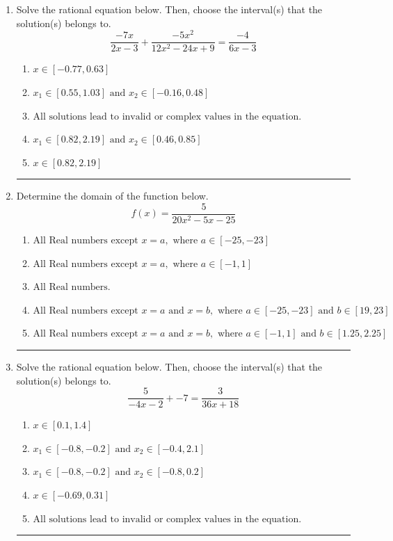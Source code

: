 \documentclass[14pt]{extbook}
\newcommand{\litem}[1]{\item#1\hspace*{-1cm}\rule{\textwidth}{0.4pt}}
\begin{document}
\begin{enumerate}
{\begin{enumerate}[label=\Alph*.]
\end{enumerate} }
\litem{
Solve the rational equation below. Then, choose the interval(s) that the solution(s) belongs to.\[ \frac{-7x}{2x -3} + \frac{-5x^{2}}{12x^{2} -24 x + 9} = \frac{-4}{6x -3} \]\begin{enumerate}[label=\Alph*.]
\item \( x \in [-0.77,0.63] \)
\item \( x_1 \in [0.55, 1.03] \text{ and } x_2 \in [-0.16,0.48] \)
\item \( \text{All solutions lead to invalid or complex values in the equation.} \)
\item \( x_1 \in [0.82, 2.19] \text{ and } x_2 \in [0.46,0.85] \)
\item \( x \in [0.82,2.19] \)

\end{enumerate} }
\litem{
Determine the domain of the function below.\[ f(x) = \frac{5}{20x^{2} -5 x -25} \]\begin{enumerate}[label=\Alph*.]
\item \( \text{All Real numbers except } x = a, \text{ where } a \in [-25, -23] \)
\item \( \text{All Real numbers except } x = a, \text{ where } a \in [-1, 1] \)
\item \( \text{All Real numbers.} \)
\item \( \text{All Real numbers except } x = a \text{ and } x = b, \text{ where } a \in [-25, -23] \text{ and } b \in [19, 23] \)
\item \( \text{All Real numbers except } x = a \text{ and } x = b, \text{ where } a \in [-1, 1] \text{ and } b \in [1.25, 2.25] \)

\end{enumerate} }
\litem{
Solve the rational equation below. Then, choose the interval(s) that the solution(s) belongs to.\[ \frac{5}{-4x -2} + -7 = \frac{3}{36x + 18} \]\begin{enumerate}[label=\Alph*.]
\item \( x \in [0.1,1.4] \)
\item \( x_1 \in [-0.8, -0.2] \text{ and } x_2 \in [-0.4,2.1] \)
\item \( x_1 \in [-0.8, -0.2] \text{ and } x_2 \in [-0.8,0.2] \)
\item \( x \in [-0.69,0.31] \)
\item \( \text{All solutions lead to invalid or complex values in the equation.} \)


\end{enumerate}}
\end{enumerate}
\end{document}
